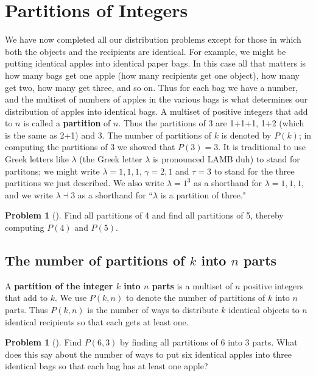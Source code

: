 \documentclass[10pt,]{book}
\newcommand{\terminology}[1]{\textbf{#1}}
\theoremstyle{plain}
\theoremstyle{definition}
\newtheorem{activity}[project]{Problem}
\theoremstyle{definition}
\numberwithin{equation}{chapter}
\begin{document}
\section[{Partitions of Integers}]{Partitions of Integers}\label{s3-3-partitions-int}
We have now completed all our distribution problems except for those in which both the objects and the recipients are identical. For example, we might be putting identical apples into identical paper bags. In this case all that matters is how many bags get one apple (how many recipients get one object), how many get two, how many get three, and so on. Thus for each bag we have a number, and the multiset of numbers of apples in the various bags is what determines our distribution of apples into identical bags. A multiset of positive integers that add to \(n\) is called a \terminology{partition} of \(n\). Thus the partitions of 3 are 1+1+1, 1+2 (which is the same as 2+1) and 3. The number of partitions of \(k\) is denoted by \(P(k)\); in computing the partitions of 3 we showed that \(P(3) = 3\). It is traditional to use Greek letters like \(\lambda\) (the Greek letter \(\lambda\) is pronounced LAMB duh) to stand for partitons; we might write \(\lambda= 1,1,1\), \(\gamma= 2,1\) and \(\tau = 3\) to stand for the three partitions we just described. We also write \(\lambda = 1^3\) as a shorthand for \(\lambda = 1,1,1\), and we write \(\lambda \dashv 3\) as a shorthand for ``\(\lambda\) is a partition of three."%
\begin{activity}[] \label{activity-157}
Find all partitions of 4 and find all partitions of 5, thereby computing \(P(4)\) and \(P(5)\).%
\end{activity}
\typeout{************************************************}
\typeout{************************************************}
\subsection[{The number of partitions of \(k\) into \(n\) parts}]{The number of partitions of \(k\) into \(n\) parts}\label{subsection-36}
A \terminology{partition of the integer \(k\) into \(n\) parts} is a multiset of \(n\) positive integers that add to \(k\). We use \(P(k,n)\) to denote the number of partitions of \(k\) into \(n\) parts. Thus \(P(k,n)\) is the number of ways to distribute \(k\) identical objects to \(n\) identical recipients so that each gets at least one.%
\begin{activity}[] \label{activity-158}
Find \(P(6,3)\) by finding all partitions of 6 into 3 parts. What does this say about the number of ways to put six identical apples into three identical bags so that each bag has at least one apple?%
\end{activity}
\typeout{************************************************}
\typeout{************************************************}
\end{document}
